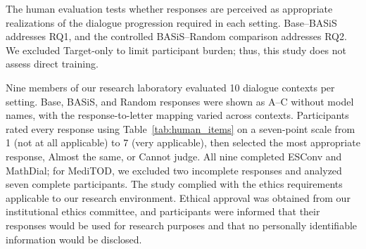 \documentclass[manuscript,review,anonymous]{acmart}
\begin{document}
The human evaluation tests whether responses are perceived as appropriate realizations of the dialogue progression required in each setting. Base--BASiS addresses RQ1, and the controlled BASiS--Random comparison addresses RQ2. We excluded Target-only to limit participant burden; thus, this study does not assess direct training.

Nine members of our research laboratory evaluated 10 dialogue contexts per setting. Base, BASiS, and Random responses were shown as A--C without model names, with the response-to-letter mapping varied across contexts. Participants rated every response using Table~\ref{tab:human_items} on a seven-point scale from 1 (not at all applicable) to 7 (very applicable), then selected the most appropriate response, Almost the same, or Cannot judge. All nine completed ESConv and MathDial; for MediTOD, we excluded two incomplete responses and analyzed seven complete participants. The study complied with the ethics requirements applicable to our research environment. Ethical approval was obtained from our institutional ethics committee, and participants were informed that their responses would be used for research purposes and that no personally identifiable information would be disclosed.
\end{document}
